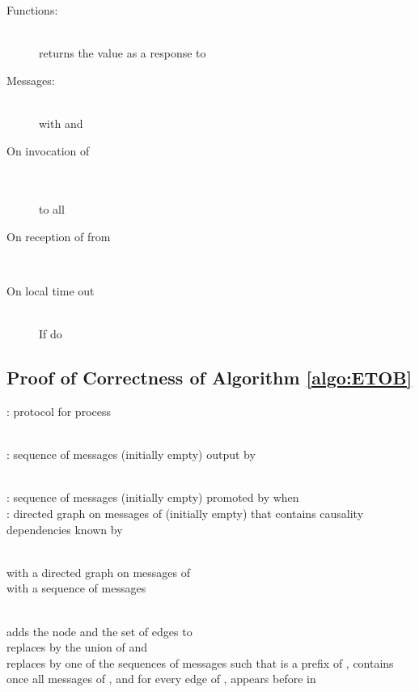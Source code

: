 \documentclass[11pt]{article}
\begin{document}
{\begin{algorithm}
\begin{description}
\item[Functions:]~\\
 returns the value  as a response to 

\item[Messages:]~\\
 with  and 

\item[On invocation of ]~\\
\\
  to all

\item[On reception of  from ]~\\


\item[On local time out]~\\
If  do\\


\end{description}
\normalsize
\end{algorithm}

\subsection{Proof of Correctness of Algorithm \ref{algo:ETOB}}\label{sub:ETOB}


\begin{algorithm}[t]
\caption{: protocol for process }\label{algo:ETOB}
\footnotesize
\begin{description}\itemsep0pt

\item[Output variable:]~\\
: sequence of messages  (initially empty) output by 

\item[Internal variables:]~\\
: sequence of messages  (initially empty) promoted by  when \\
: directed graph on messages of  (initially empty) that contains causality dependencies known by 

\item[Messages:]~\\
  with  a directed graph on messages of \\
 with  a sequence of messages 

\item[Functions:]~\\
 adds the node  and the set of edges  to \\
 replaces  by the union of  and \\
 replaces  by one of the sequences of messages  such that  is a prefix of ,  contains once all messages of , and for every edge  of ,  appears before  in 


\end{description}
\end{algorithm}}
\end{document}
